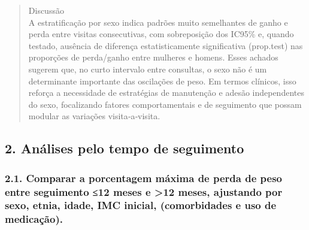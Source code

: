 \documentclass[
]{article}
\begin{document}
\begin{quote}
Discussão\\
A estratificação por sexo indica padrões muito semelhantes de ganho e
perda entre visitas consecutivas, com sobreposição dos IC95\% e, quando
testado, ausência de diferença estatisticamente significativa
(prop.test) nas proporções de perda/ganho entre mulheres e homens. Esses
achados sugerem que, no curto intervalo entre consultas, o sexo não é um
determinante importante das oscilações de peso. Em termos clínicos, isso
reforça a necessidade de estratégias de manutenção e adesão
independentes do sexo, focalizando fatores comportamentais e de
seguimento que possam modular as variações visita‑a‑visita.\\
\end{quote}

\subsection{2. Análises pelo tempo de
seguimento}\label{anuxe1lises-pelo-tempo-de-seguimento}

\subsubsection{2.1. Comparar a porcentagem máxima de perda de peso entre
seguimento ≤12 meses e \textgreater12 meses, ajustando por sexo, etnia,
idade, IMC inicial, (comorbidades e uso de
medicação).}\label{comparar-a-porcentagem-muxe1xima-de-perda-de-peso-entre-seguimento-12-meses-e-12-meses-ajustando-por-sexo-etnia-idade-imc-inicial-comorbidades-e-uso-de-medicauxe7uxe3o.}
\end{document}
